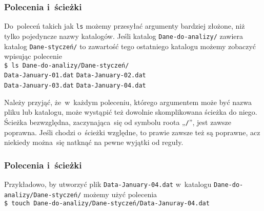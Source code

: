 \documentclass[10pt,t]{beamer}
\begin{document}
\begin{frame}
  \frametitle{Polecenia i~ścieżki}


  Do~poleceń takich jak \texttt{ls} możemy przesyłać argumenty bardziej
  złożone, niż tylko pojedyncze nazwy katalogów. Jeśli katalog
  \texttt{Dane-do-analizy/} zawiera katalog \texttt{Dane-styczeń/} to
  zawartość tego ostatniego katalogu możemy zobaczyć wpisując
  polecenie \\
  \texttt{\$ ls Dane-do-analizy/Dane-styczeń/} \\
  \texttt{Data-January-01.dat} \quad \texttt{Data-January-02.dat} \\
  \texttt{Data-January-03.dat} \quad \texttt{Data-January-04.dat}

  Należy przyjąć, że~w~każdym poleceniu, którego argumentem może być nazwa
  pliku lub katalogu, może wystąpić też dowolnie skomplikowana ścieżka do
  niego. Ścieżka bezwzględna, zaczynająca~się od symbolu roota
  „\texttt{/}”, jest zawsze poprawna. Jeśli chodzi o~ścieżki względne, to
  prawie zawsze też są poprawne, acz niekiedy można~się natknąć na pewne
  wyjątki od reguły.

\end{frame}





\begin{frame}
  \frametitle{Polecenia i~ścieżki}


  Przykładowo, by utworzyć plik \texttt{Data-January-04.dat} w~katalogu
  \texttt{Dane-do-analizy/Dane-styczeń/} możemy użyć polecenia \\
  \texttt{\$ touch Dane-do-analizy/Dane-styczeń/Data-Januray-04.dat}


\end{frame}














\end{document}
